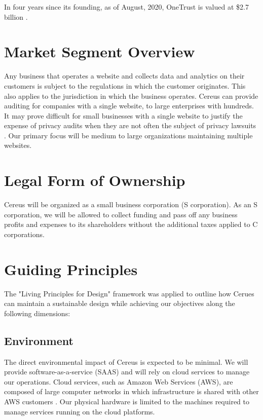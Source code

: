In four years since its founding, as of August, 2020, OneTrust is valued at \$2.7 billion \cite{hughes.iapp.2020}.

\section{Market Segment Overview}

Any business that operates a website and collects data and analytics on their customers is subject to the regulations in which the customer originates. This also applies to the jurisdiction in which the business operates. Cereus can provide auditing for companies with a single website, to large enterprises with hundreds. It may prove difficult for small businesses with a single website to justify the expense of privacy audits when they are not often the subject of privacy lawsuits \cite{lanou.2020}. Our primary focus will be medium to large organizations maintaining multiple websites. 


\section{Legal Form of Ownership} \label{legal.ownership}

Cereus will be organized as a small business corporation (S corporation). As an S corporation, we will be allowed to collect funding and pass off any business profits and expenses to its shareholders without the additional taxes applied to C corporations.

\section{Guiding Principles} \label{guiding.principles}

The "Living Principles for Design" framework \cite{brink.aiga.2020} was applied to outline how Cerues can maintain a sustainable design while achieving our objectives along the following dimensions:

\subsection{Environment}

The direct environmental impact of Cereus is expected to be minimal. We will provide software-as-a-service (SAAS) and will rely on cloud services to manage our operations. Cloud services, such as Amazon Web Services (AWS), are composed of large computer networks in which infrastructure is shared with other AWS customers \cite{aws.2020}. Our physical hardware is limited to the machines required to manage services running on the cloud platforms.

